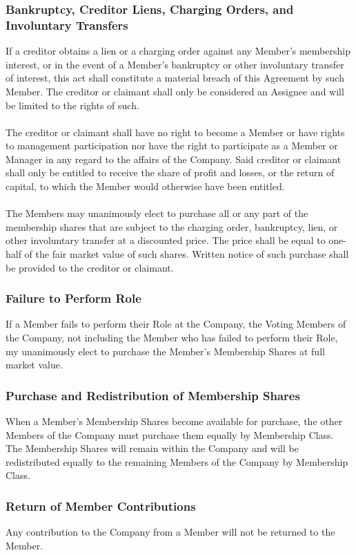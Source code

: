 \documentclass[11pt]{article}
\begin{document}
\subsubsection{Bankruptcy, Creditor Liens, Charging Orders, and Involuntary Transfers}
If a creditor obtains a lien or a charging order against any Member's membership interest, or in the event of a Member's bankruptcy or other involuntary transfer of interest, this act shall constitute a material breach of this Agreement by such Member. The creditor or claimant shall only be considered an Assignee and will be limited to the rights of such.\\\\
The creditor or claimant shall have no right to become a Member or have rights to management participation nor have the right to participate as a Member or Manager in any regard to the affairs of the Company. Said creditor or claimant shall only be entitled to receive the share of profit and losses, or the return of capital, to which the Member would otherwise have been entitled.\\\\
The Members may unanimously elect to purchase all or any part of the membership shares that are subject to the charging order, bankruptcy, lien, or other involuntary transfer at a discounted price. The price shall be equal to one-half of the fair market value of such shares. Written notice of such purchase shall be provided to the creditor or claimant.

\subsubsection{Failure to Perform Role}
If a Member fails to perform their Role at the Company, the Voting Members of the Company, not including the Member who has failed to perform their Role, my unanimously elect to purchase the Member's Membership Shares at full market value.

\subsubsection{Purchase and Redistribution of Membership Shares}
When a Member's Membership Shares become available for purchase, the other Members of the Company must purchase them equally by Membership Class. The Membership Shares will remain within the Company and will be redistributed equally to the remaining Members of the Company by Membership Class.

\subsubsection{Return of Member Contributions}
Any contribution to the Company from a Member will not be returned to the Member.
\end{document}
